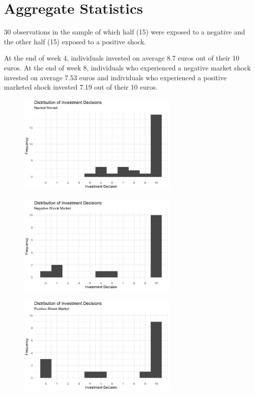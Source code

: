 \documentclass[12pt, a4paper]{article}
\theoremstyle{remark}
\begin{document}
\section{Aggregate Statistics}



30 observations in the sample of which half (15) were exposed to a negative and the other half (15) exposed to a positive shock.

At the end of week 4, individuals invested on average 8.7 euros out of their 10 euros. At the end of week 8, individuals who experienced a negative market shock invested on average 7.53 euros and individuals who experienced a positive marketed shock invested 7.19 out of their 10 euros.

\begin{figure}[H]
	\centering
	\includegraphics[width=0.7\textwidth]{investment-decisions-neutral-market-distribution}
\end{figure}

\begin{figure}[H]
	\centering
	\includegraphics[width=0.7\textwidth]{investment-decisions-negative-shock-distribution}
\end{figure}

\begin{figure}[H]
	\centering
	\includegraphics[width=0.7\textwidth]{investment-decisions-positive-shock-distribution}
\end{figure}
\end{document}
